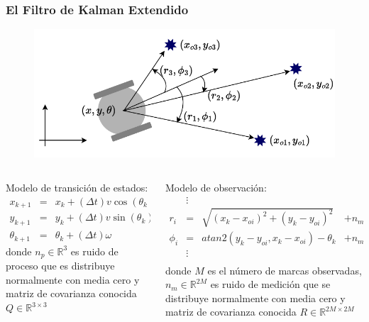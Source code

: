 \begin{frame}\frametitle{El Filtro de Kalman Extendido}
  \begin{figure}
    \centering
    \includegraphics[height=0.4\textheight]{Figures/MotionPlanning/EKF1.pdf}
  \end{figure}
  \begin{columns}
    \begin{column}{0.45\textwidth}
      Modelo de transición de estados:
      \[\left.
      \begin{array}{cclc}
        x_{k+1}      &=& x_k + (\Delta t)v\cos(\theta_k) & + n_{p1}\\
        y_{k+1}      &=& y_k + (\Delta t)v\sin(\theta_k) & + n_{p2}\\
        \theta_{k+1} &=& \theta_k + (\Delta t)\omega     & + n_{p3}
      \end{array}\right\}f(x)
    \]
    donde $n_p\in\mathbb{R}^3$ es ruido de proceso que es distribuye normalmente con
    media cero y matriz de covarianza conocida $Q\in\mathbb{R}^{3\times 3}$
    \end{column}
    \begin{column}{0.55\textwidth}
      Modelo de observación:
      \[\left.
        \begin{array}{cclc}
                 &\vdots& & \\
        r_{i}    &=& \sqrt{(x_k - x_{oi})^2 + (y_k - y_{oi})^2}   & + n_{m1}\\
        \phi_{i} &=& atan2(y_k - y_{oi}, x_k - x_{oi}) - \theta_k & + n_{m2}\\
                 &\vdots& & \\
      \end{array}\right\}h(x)
    \]
    donde $M$ es el número de marcas observadas, $n_m\in\mathbb{R}^{2M}$ es ruido de medición que se distribuye normalmente con media cero y matriz de covarianza conocida $R\in\mathbb{R}^{2M\times 2M}$
    \end{column}
  \end{columns}
\end{frame}

